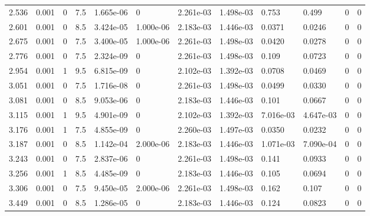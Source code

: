 \documentclass[preview]{standalone}
\begin{document}
{{\begin{tabular}{L{1.2cm}C{1.2cm} C{0.3cm}C{0.5cm} C{1.4cm}C{1.4cm} C{1.4cm}C{1.4cm} C{1.6cm}C{1.6cm} C{1.6cm}C{1.6cm}}
  2.536  &  0.001  & 0     & 7.5 &  1.665e-06  & 0  &  2.261e-03&   1.498e-03& 0.753 & 0.499   &  0 & 0  \\ 
  2.601  &  0.001  & 0     & 8.5 &  3.424e-05  & 1.000e-06  &  2.183e-03&   1.446e-03& 0.0371 & 0.0246   &  0 & 0  \\ 
  2.675  &  0.001  & 0     & 7.5 &  3.400e-05  & 1.000e-06  &  2.261e-03&   1.498e-03& 0.0420 & 0.0278   &  0 & 0  \\ 
  2.776  &  0.001  & 0     & 7.5 &  2.324e-09  & 0  &  2.261e-03&   1.498e-03& 0.109 & 0.0723   &  0 & 0  \\ 
  2.954  &  0.001  & 1     & 9.5 &  6.815e-09  & 0  &  2.102e-03&   1.392e-03& 0.0708 & 0.0469   &  0 & 0  \\ 
  3.051  &  0.001  & 0     & 7.5 &  1.716e-08  & 0  &  2.261e-03&   1.498e-03& 0.0499 & 0.0330   &  0 & 0  \\ 
  3.081  &  0.001  & 0     & 8.5 &  9.053e-06  & 0  &  2.183e-03&   1.446e-03& 0.101 & 0.0667   &  0 & 0  \\ 
  3.115  &  0.001  & 1     & 9.5 &  4.901e-09  & 0  &  2.102e-03&   1.392e-03& 7.016e-03 & 4.647e-03   &  0 & 0  \\ 
  3.176  &  0.001  & 1     & 7.5 &  4.855e-09  & 0  &  2.260e-03&   1.497e-03& 0.0350 & 0.0232   &  0 & 0  \\ 
  3.187  &  0.001  & 0     & 8.5 &  1.142e-04  & 2.000e-06  &  2.183e-03&   1.446e-03& 1.071e-03 & 7.090e-04   &  0 & 0  \\ 
  3.243  &  0.001  & 0     & 7.5 &  2.837e-06  & 0  &  2.261e-03&   1.498e-03& 0.141 & 0.0933   &  0 & 0  \\ 
  3.256  &  0.001  & 1     & 8.5 &  4.485e-09  & 0  &  2.183e-03&   1.446e-03& 0.105 & 0.0694   &  0 & 0  \\ 
  3.306  &  0.001  & 0     & 7.5 &  9.450e-05  & 2.000e-06  &  2.261e-03&   1.498e-03& 0.162 & 0.107   &  0 & 0  \\ 
  3.449  &  0.001  & 0     & 8.5 &  1.286e-05  & 0  &  2.183e-03&   1.446e-03& 0.124 & 0.0823   &  0 & 0  \\ 
\hline 
\end{tabular} 

}}
\end{document}
